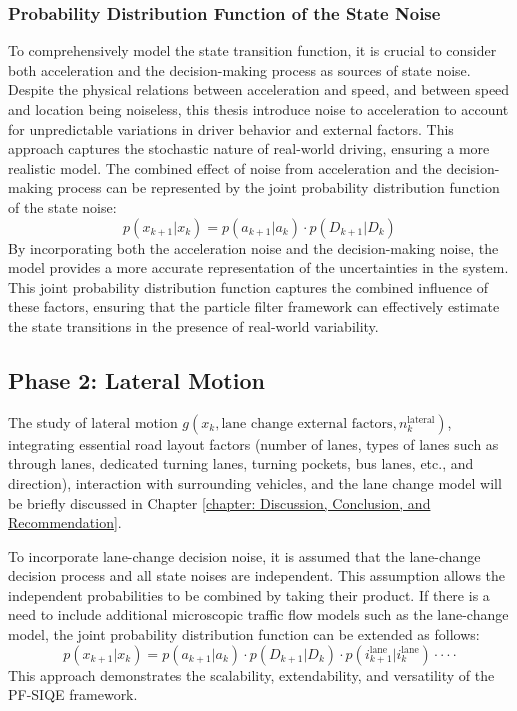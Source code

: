 \subsubsection{Probability Distribution Function of the State Noise}
To comprehensively model the state transition function, it is crucial to consider both acceleration and the decision-making process as sources of state noise. Despite the physical relations between acceleration and speed, and between speed and location being noiseless, this thesis introduce noise to acceleration to account for unpredictable variations in driver behavior and external factors. This approach captures the stochastic nature of real-world driving, ensuring a more realistic model. The combined effect of noise from acceleration and the decision-making process can be represented by the joint probability distribution function of the state noise:
\begin{equation}
    p(x_{k+1}|x_k) = p(a_{k+1}|a_k) \cdot p(D_{k+1}|D_k)
\end{equation}
By incorporating both the acceleration noise and the decision-making noise, the model provides a more accurate representation of the uncertainties in the system. This joint probability distribution function captures the combined influence of these factors, ensuring that the particle filter framework can effectively estimate the state transitions in the presence of real-world variability.

\subsection{Phase 2: Lateral Motion}\label{Lateral}
The study of lateral motion $g(x_k, \text{lane change external factors}, n_k^\text{lateral})$, integrating essential road layout factors (number of lanes, types of lanes such as through lanes, dedicated turning lanes, turning pockets, bus lanes, etc., and direction), interaction with surrounding vehicles, and the lane change model will be briefly discussed in Chapter \ref{chapter: Discussion, Conclusion, and Recommendation}. 

To incorporate lane-change decision noise, it is assumed that the lane-change decision process and all state noises are independent. This assumption allows the independent probabilities to be combined by taking their product. If there is a need to include additional microscopic traffic flow models such as the lane-change model, the joint probability distribution function can be extended as follows:
\begin{equation}
p(x_{k+1}|x_k) = p(a_{k+1}|a_k) \cdot p(D_{k+1}|D_k) \cdot p(i_{k+1}^{\text{lane}}|i_{k}^{\text{lane}}) \cdot \cdot \cdot \cdot
\end{equation}
This approach demonstrates the scalability, extendability, and versatility of the PF-SIQE framework.

